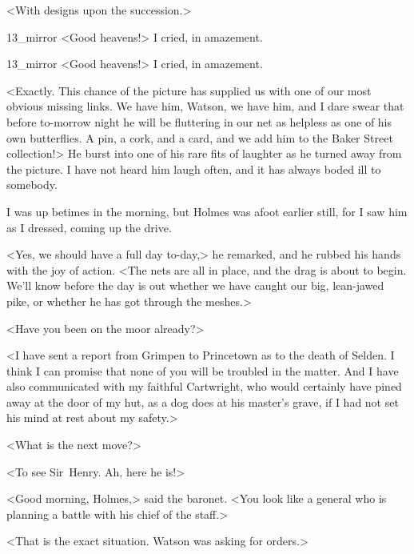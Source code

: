 <With designs upon the succession.>

\begin{letter}
	\begin{bwbigpic}
			[1.0]  
		{13_mirror}
		{<Good heavens!> I cried, in amazement.}
	\end{bwbigpic}
\end{letter}
\begin{a4}
	\begin{bwbigpic}
		[1.0] 
		{13_mirror}
		{<Good heavens!> I cried, in amazement.}
	\end{bwbigpic}
\end{a4}



<Exactly. This chance of the picture has supplied us with one of our most obvious missing links. We have him, Watson, we have him, and I dare swear that before to-morrow night he will be fluttering in our net as helpless as one of his own butterflies. A pin, a cork, and a card, and we add him to the Baker Street collection!> He burst into one of his rare fits of laughter as he turned away from the picture. I have not heard him laugh often, and it has always boded ill to somebody.

I was up betimes in the morning, but Holmes was afoot earlier still, for I saw him as I dressed, coming up the drive.

<Yes, we should have a full day to-day,> he remarked, and he rubbed his hands with the joy of action. <The nets are all in place, and the drag is about to begin. We'll know before the day is out whether we have caught our big, lean-jawed pike, or whether he has got through the meshes.>

<Have you been on the moor already?>

<I have sent a report from Grimpen to Princetown as to the death of Selden. I think I can promise that none of you will be troubled in the matter. And I have also communicated with my faithful Cartwright, who would certainly have pined away at the door of my hut, as a dog does at his master's grave, if I had not set his mind at rest about my safety.>

<What is the next move?>

<To see Sir~Henry. Ah, here he is!>

<Good morning, Holmes,> said the baronet. <You look like a general who is planning a battle with his chief of the staff.>

<That is the exact situation. Watson was asking for orders.>

